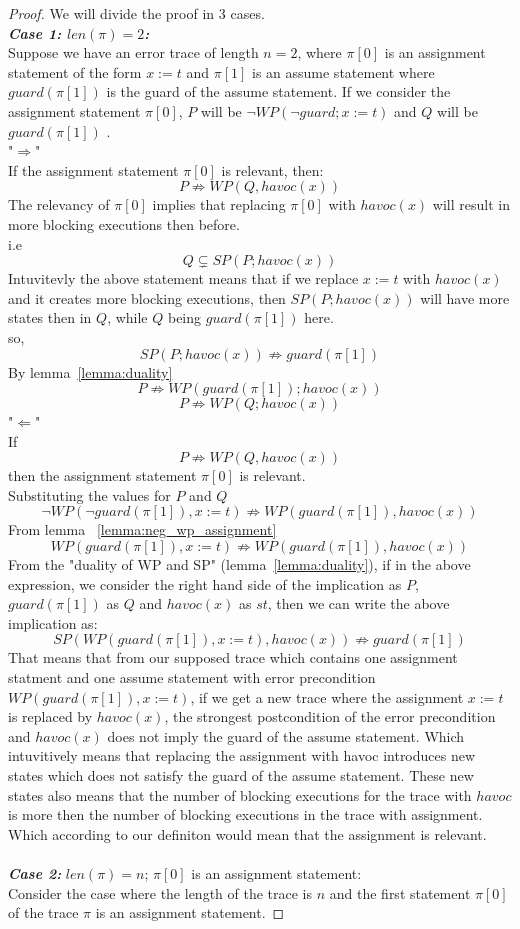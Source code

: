 \documentclass{article}
\newcommand{\limp}{\Rightarrow}
\begin{document}
\begin{proof}
We will divide the proof in 3 cases. \\
\textit{\textbf{Case 1: $len(\pi) = 2$:}} \\
Suppose we have an error trace of length $n=2$, where $\pi[0]$ is an assignment statement of the form $x:=t$ and $\pi[1]$ is an assume statement where $guard(\pi[1])$ is the guard of the assume statement. If we consider the assignment statement $\pi[0]$, $P$ will be $\neg WP(\neg guard; x:=t)$ and $Q$ will be $guard(\pi[1])$ .\\
"$\Rightarrow$"\\
If the assignment statement $\pi[0]$ is relevant, then: \\
 $$P \not \limp WP(Q,havoc(x))$$
 The relevancy of $\pi[0]$ implies that replacing $\pi[0]$ with $havoc(x)$ will result in more blocking executions then before.\\
 i.e
 $$Q \subsetneq SP(P; havoc(x))$$ 
 Intuvitevly the above statement means that if we replace $x:=t$ with $havoc(x)$ and it creates more blocking executions, then $SP(P; havoc(x))$ will have more states then in $Q$, while $Q$ being $guard(\pi[1])$ here. \\
so,
$$SP(P; havoc(x)) \not \limp guard(\pi[1])$$
By lemma~\ref{lemma:duality} 
$$P \not\limp WP(guard(\pi[1]); havoc(x))$$
$$P \not\limp WP(Q; havoc(x))$$
"$\Leftarrow$"\\
If
$$P \not \limp WP(Q, havoc(x))$$
then the assignment statement $\pi[0]$ is relevant.\\
Substituting the values for $P$ and $Q$
$$\neg WP(\neg guard(\pi[1]), x:=t) \not\limp WP(guard(\pi[1]), havoc(x))$$
From lemma ~\ref{lemma:neg_wp_assignment}
$$WP(guard(\pi[1]), x:=t) \not\limp WP(guard(\pi[1]), havoc(x))$$
From the "duality of WP and SP" (lemma~\ref{lemma:duality}), if in the above expression, we consider the right hand side of the implication as $P$, $guard(\pi[1])$ as $Q$ and $havoc(x)$ as $st$, then we can write the above implication as: \\
$$SP(WP(guard(\pi[1]), x:=t), havoc(x)) \not\limp guard(\pi[1])$$
That means that from our supposed trace which contains one assignment statment and one assume statement with error precondition $WP(guard(\pi[1]),x:=t)$, if we get a new trace where the assignment $x:=t$ is replaced by $havoc(x)$, the strongest postcondition of the error precondition and $havoc(x)$ does not imply the guard of the assume statement. Which intuvitively means that replacing the assignment with havoc introduces new states which does not satisfy the guard of the assume statement. These new states also means that the number of blocking executions for the trace with $havoc$ is more then the number of blocking executions in the trace with assignment. Which according to our definiton would mean that the assignment is relevant.\\
\\
\textit{\textbf{Case 2:}} $len(\pi)=n$; $\pi[0]$ is an assignment statement: \\
Consider the case where the length of the trace is $n$ and the first statement $\pi[0]$ of the trace $\pi$ is an assignment statement. 
\end{proof}
\end{document}
